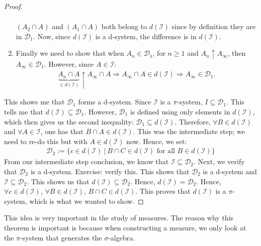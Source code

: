 \documentclass[11pt]{article}
\theoremstyle{definition}
\theoremstyle{theorem}
\begin{document}
\begin{proof}
\begin{enumerate}[noitemsep]
\begin{align*}
		\end{align*}
		\( ( A_2 \cap A)  \) and \( (A_1 \cap A ) \) both belong to \( d (\mathcal{I}) \) since by definition they are in \( \mathcal{D}_1 \). Now, since \( d(\mathcal{I}) \) is a d-system, the difference is in \( d( \mathcal{I} ) \). 
		\item Finally we need to show that when \( A_n \in \mathcal{D}_1 \), for \( n \geq 1 \) and \( A_n \uparrow A_\infty  \), then \( A_\infty \in \mathcal{D}_1 \). However, since \( A \in \mathcal{I} \): 
\begin{align*}
	\underbrace{A_n \cap A}_{\in d( \mathcal{I} )} \uparrow A_\infty \cap A  \Rightarrow A_\infty \cap A \in d( \mathcal{I}) \Rightarrow A_\infty \in \mathcal{D}_1.	
 \end{align*}
	\end{enumerate} 
	
	This shows me that \( \mathcal{D}_1 \) forms a d-system. Since \( \mathcal{I} \) is a \( \pi \)-system, \( I \subseteq \mathcal{D}_1 \). This tells me that \( d ( \mathcal{I}) \subseteq \mathcal{D}_1 \). However, \( \mathcal{D}_1 \)   is defined using only elements in \( d ( \mathcal{I}) \), which then gives us the second inequality: \( \mathcal{D}_1 \subseteq d ( \mathcal{I}) \).  Therefore, \( \forall B \in d( \mathcal{I} ) \) and  \( \forall A \in \mathcal{I} \), one has that \( B \cap A \in d( \mathcal{I}) \). This was the intermediate step; we need to re-do this but with \( A \in d( \mathcal{I} ) \) now. Hence, we set: 
	\begin{align*}
		\mathcal{D}_2 := \{ c \in d( \mathcal{I} )\ |\ B \cap C \in d ( \mathcal{I} ) \text{ for  all } B \in d( \mathcal{I}) \} 	
	\end{align*}
	From our intermediate step conclusion, we know that \( \mathcal{I} \subseteq \mathcal{D}_2 \). Next, we verify that \( \mathcal{D}_2 \) is a d-system. Exercise: verify this. This shows that \( \mathcal{D}_2 \) is a d-system and \( \mathcal{I} \subseteq \mathcal{D}_2 \). This shows us that \( d (\mathcal{I}) \subseteq \mathcal{D}_2 \). Hence, \( d( \mathcal{I} ) = \mathcal{D}_2 \). Hence, \( \forall c \in d ( \mathcal{I} ) \), \( \forall B \in d( \mathcal{I} ) \), \( B \cap C \in d( \mathcal{I} ) \). This proves that \( d ( \mathcal{I} ) \) is a \( \pi \)-system, which is what we wanted to show.
\end{proof}
This idea is very important in the study of measures. The reason why this theorem is important is because when constructing a measure, we only look at the \( \pi \)-system that generates the \( \sigma \)-algebra. 
\end{document}
